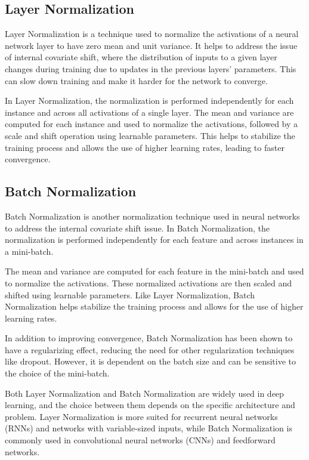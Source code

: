 \documentclass[12pt]{article}
\begin{document}
\subsection{Layer Normalization}
Layer Normalization is a technique used to normalize the activations of a neural network layer to have zero mean and unit variance. It helps to address the issue of internal covariate shift, where the distribution of inputs to a given layer changes during training due to updates in the previous layers' parameters. This can slow down training and make it harder for the network to converge.

In Layer Normalization, the normalization is performed independently for each instance and across all activations of a single layer. The mean and variance are computed for each instance and used to normalize the activations, followed by a scale and shift operation using learnable parameters. This helps to stabilize the training process and allows the use of higher learning rates, leading to faster convergence.

\subsection{Batch Normalization}
Batch Normalization is another normalization technique used in neural networks to address the internal covariate shift issue. In Batch Normalization, the normalization is performed independently for each feature and across instances in a mini-batch.

The mean and variance are computed for each feature in the mini-batch and used to normalize the activations. These normalized activations are then scaled and shifted using learnable parameters. Like Layer Normalization, Batch Normalization helps stabilize the training process and allows for the use of higher learning rates.

In addition to improving convergence, Batch Normalization has been shown to have a regularizing effect, reducing the need for other regularization techniques like dropout. However, it is dependent on the batch size and can be sensitive to the choice of the mini-batch.

Both Layer Normalization and Batch Normalization are widely used in deep learning, and the choice between them depends on the specific architecture and problem. Layer Normalization is more suited for recurrent neural networks (RNNs) and networks with variable-sized inputs, while Batch Normalization is commonly used in convolutional neural networks (CNNs) and feedforward networks.
\end{document}
